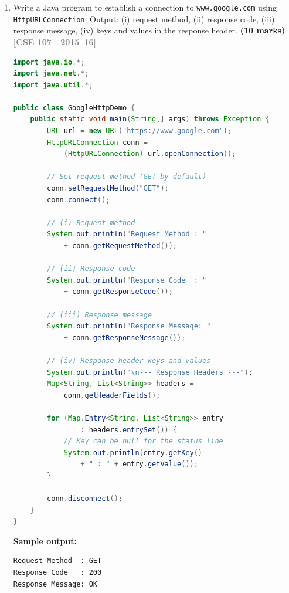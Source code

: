 \documentclass[12pt,a3paper]{article}
\newcommand{\yr}[1]{\hfill\textcolor{gray}{\small\textbf{[#1]}}}
\newcommand{\mk}[1]{\textcolor{orange!70!black}{\small\textbf{(#1 marks)}}}
\begin{document}
\begin{enumerate}
\begin{tcolorbox}
\end{tcolorbox}

\item Write a Java program to establish a connection to \texttt{www.google.com} using \\\texttt{HttpURLConnection}. Output: (i) request method, (ii) response code, (iii) response message, (iv) keys and values in the response header. \mk{10}
\yr{CSE 107 | 2015--16}

\begin{tcolorbox}[enhanced,breakable,ansbox,
  colback=cB!4,colframe=cB,boxrule=0.8pt,arc=5pt,
  title={\textbf{Answer — HttpURLConnection to
  www.google.com}},
  fonttitle=\bfseries\color{white},colbacktitle=cB]

\begin{lstlisting}[language=Java]
import java.io.*;
import java.net.*;
import java.util.*;

public class GoogleHttpDemo {
    public static void main(String[] args) throws Exception {
        URL url = new URL("https://www.google.com");
        HttpURLConnection conn =
            (HttpURLConnection) url.openConnection();

        // Set request method (GET by default)
        conn.setRequestMethod("GET");
        conn.connect();

        // (i) Request method
        System.out.println("Request Method : "
            + conn.getRequestMethod());

        // (ii) Response code
        System.out.println("Response Code  : "
            + conn.getResponseCode());

        // (iii) Response message
        System.out.println("Response Message: "
            + conn.getResponseMessage());

        // (iv) Response header keys and values
        System.out.println("\n--- Response Headers ---");
        Map<String, List<String>> headers =
            conn.getHeaderFields();

        for (Map.Entry<String, List<String>> entry
                : headers.entrySet()) {
            // Key can be null for the status line
            System.out.println(entry.getKey()
                + " : " + entry.getValue());
        }

        conn.disconnect();
    }
}
\end{lstlisting}

\medskip
\textbf{Sample output:}
\begin{verbatim}
Request Method  : GET
Response Code   : 200
Response Message: OK


\end{verbatim}
\end{tcolorbox}
\end{enumerate}
\end{document}
